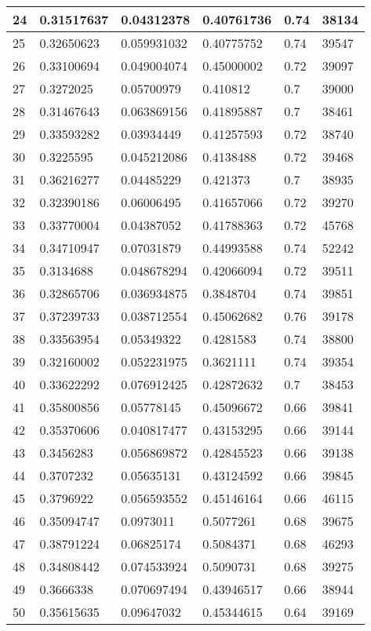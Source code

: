\begin{longtable}{|l|l|l|l|l|l|}
24 & 0.31517637 & 0.04312378 & 0.40761736 & 0.74 & 38134 \\ \hline 
25 & 0.32650623 & 0.059931032 & 0.40775752 & 0.74 & 39547 \\ \hline 
26 & 0.33100694 & 0.049004074 & 0.45000002 & 0.72 & 39097 \\ \hline 
27 & 0.3272025 & 0.05700979 & 0.410812 & 0.7 & 39000 \\ \hline 
28 & 0.31467643 & 0.063869156 & 0.41895887 & 0.7 & 38461 \\ \hline 
29 & 0.33593282 & 0.03934449 & 0.41257593 & 0.72 & 38740 \\ \hline 
30 & 0.3225595 & 0.045212086 & 0.4138488 & 0.72 & 39468 \\ \hline 
31 & 0.36216277 & 0.04485229 & 0.421373 & 0.7 & 38935 \\ \hline 
32 & 0.32390186 & 0.06006495 & 0.41657066 & 0.72 & 39270 \\ \hline 
33 & 0.33770004 & 0.04387052 & 0.41788363 & 0.72 & 45768 \\ \hline 
34 & 0.34710947 & 0.07031879 & 0.44993588 & 0.74 & 52242 \\ \hline 
35 & 0.3134688 & 0.048678294 & 0.42066094 & 0.72 & 39511 \\ \hline 
36 & 0.32865706 & 0.036934875 & 0.3848704 & 0.74 & 39851 \\ \hline 
37 & 0.37239733 & 0.038712554 & 0.45062682 & 0.76 & 39178 \\ \hline 
38 & 0.33563954 & 0.05349322 & 0.4281583 & 0.74 & 38800 \\ \hline 
39 & 0.32160002 & 0.052231975 & 0.3621111 & 0.74 & 39354 \\ \hline 
40 & 0.33622292 & 0.076912425 & 0.42872632 & 0.7 & 38453 \\ \hline 
41 & 0.35800856 & 0.05778145 & 0.45096672 & 0.66 & 39841 \\ \hline 
42 & 0.35370606 & 0.040817477 & 0.43153295 & 0.66 & 39144 \\ \hline 
43 & 0.3456283 & 0.056869872 & 0.42845523 & 0.66 & 39138 \\ \hline 
44 & 0.3707232 & 0.05635131 & 0.43124592 & 0.66 & 39845 \\ \hline 
45 & 0.3796922 & 0.056593552 & 0.45146164 & 0.66 & 46115 \\ \hline 
46 & 0.35094747 & 0.0973011 & 0.5077261 & 0.68 & 39675 \\ \hline 
47 & 0.38791224 & 0.06825174 & 0.5084371 & 0.68 & 46293 \\ \hline 
48 & 0.34808442 & 0.074533924 & 0.5090731 & 0.68 & 39275 \\ \hline 
49 & 0.3666338 & 0.070697494 & 0.43946517 & 0.66 & 38944 \\ \hline 
50 & 0.35615635 & 0.09647032 & 0.45344615 & 0.64 & 39169 \\ \hline 
\end{longtable}